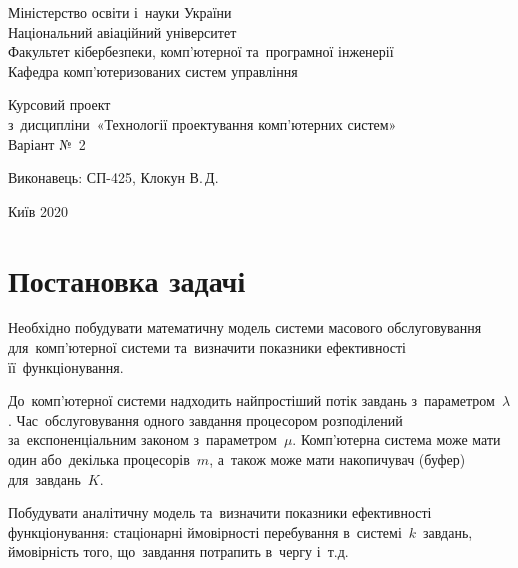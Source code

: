 \documentclass[
  ukrainian,
  simple,
  floatsection,
]{eskdnaukvd}
\begin{document}
  \begin{titlepage}
    \begin{center}
      Міністерство освіти і~науки України\\
      Національний авіаційний університет\\
      Факультет кібербезпеки, комп'ютерної та~програмної інженерії\\
      Кафедра комп'ютеризованих систем управління

      \vspace{\fill}
      Курсовий проект\\
      з~дисципліни~«Технології проектування комп'ютерних систем»\\
      Варіант №~2


      \vspace{\fill}


      \begin{flushleft}
      Виконавець: \hfill СП-425, Клокун В.\,Д.\\
      \end{flushleft}

      \vspace{\fill}

      Київ 2020
    \end{center}
  \end{titlepage}

  \newpage
  \setcounter{page}{2}

  \tableofcontents

  \section*{Постановка задачі}
    Необхідно побудувати математичну модель системи масового обслуговування для~комп’ютерної системи та~визначити показники ефективності її~функціонування.

    До~комп’ютерної системи надходить найпростіший потік завдань з~параметром~$\lambda$. Час~обслуговування одного завдання процесором розподілений за~експоненціальним законом з~параметром~$\mu$. Комп’ютерна система може мати один або~декілька процесорів~$m$, а~також може мати накопичувач (буфер) для~завдань~$K$.

    Побудувати аналітичну модель та~визначити показники ефективності функціонування: стаціонарні ймовірності перебування в~системі~$k$~завдань, ймовірність того, що~завдання потрапить в~чергу і~т.д.
\end{document}
